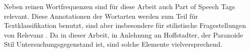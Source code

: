 Neben reinen Wortfrequenzen sind für diese Arbeit auch Part of Speech Tags relevant.
Diese Annotationen der Wortarten werden zum Teil für Textklassifikation benutzt, sind aber insbesondere für stilistische Fragestellungen von Relevanz \parencite[siehe etwa][]{jimenez_2020}.
Da in dieser Arbeit, in Anlehnung an Hoffstadter, der Paranoide Stil Untersuchungsgegenstand ist, sind solche Elemente vielversprechend.